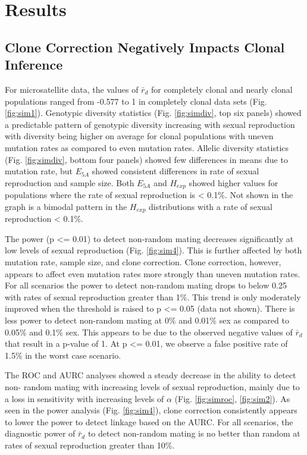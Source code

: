 \documentclass[]{article}
\theoremstyle{definition}
\theoremstyle{definition}
\theoremstyle{remark}
\begin{document}
\section{Results}\label{results}

\subsection{Clone Correction Negatively Impacts Clonal
Inference}\label{clone-correction-negatively-impacts-clonal-inference}

For microsatellite data, the values of \(\bar{r}_d\) for completely
clonal and nearly clonal populations ranged from -0.577 to 1 in
completely clonal data sets (Fig. \ref{fig:sim1}). Genotypic diversity
statistics (Fig. \ref{fig:simdiv}, top six panels) showed a predictable
pattern of genotypic diversity increasing with sexual reproduction with
diversity being higher on average for clonal populations with uneven
mutation rates as compared to even mutation rates. Allelic diversity
statistics (Fig. \ref{fig:simdiv}, bottom four panels) showed few
differences in means due to mutation rate, but \(E_{5A}\) showed
consistent differences in rate of sexual reproduction and sample size.
Both \(E_{5A}\) and \(H_{exp}\) showed higher values for populations
where the rate of sexual reproduction is \textless{} 0.1\%. Not shown in
the graph is a bimodal pattern in the \(H_{exp}\) distributions with a
rate of sexual reproduction \textless{} 0.1\%.

The power (p \textless{}= 0.01) to detect non-random mating decreases
significantly at low levels of sexual reproduction (Fig.
\ref{fig:sim4}). This is further affected by both mutation rate, sample
size, and clone correction. Clone correction, however, appears to affect
even mutation rates more strongly than uneven mutation rates. For all
scenarios the power to detect non-random mating drops to below 0.25 with
rates of sexual reproduction greater than 1\%. This trend is only
moderately improved when the threshold is raised to p \textless{}= 0.05
(data not shown). There is less power to detect non-random mating at 0\%
and 0.01\% sex as compared to 0.05\% and 0.1\% sex. This appears to be
due to the observed negative values of \(\bar{r}_d\) that result in a
p-value of 1. At p \textless{}= 0.01, we observe a false positive rate
of 1.5\% in the worst case scenario.

The ROC and AURC analyses showed a steady decrease in the ability to
detect non- random mating with increasing levels of sexual reproduction,
mainly due to a loss in sensitivity with increasing levels of \(\alpha\)
(Fig. \ref{fig:simroc}, \ref{fig:sim2}). As seen in the power analysis
(Fig. \ref{fig:sim4}), clone correction consistently appears to lower
the power to detect linkage based on the AURC. For all scenarios, the
diagnostic power of \(\bar{r}_d\) to detect non-random mating is no
better than random at rates of sexual reproduction greater than 10\%.
\end{document}
